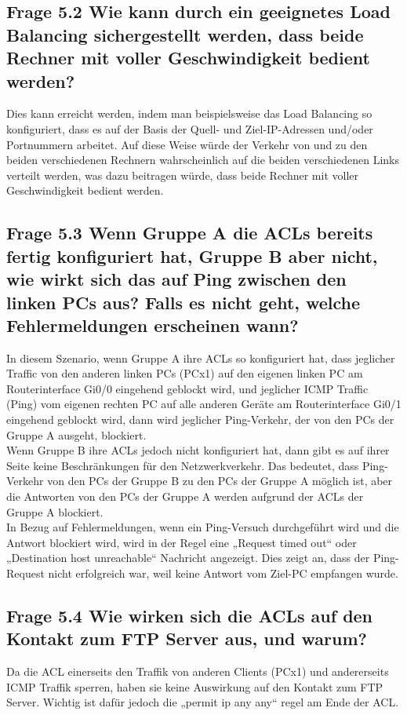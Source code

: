 \documentclass{article}
\begin{document}
\subsection*{Frage 5.2 \normalfont Wie kann durch ein geeignetes Load Balancing sichergestellt werden, dass beide Rechner mit voller Geschwindigkeit bedient werden?}
Dies kann erreicht werden, indem man beispielsweise das Load Balancing so konfiguriert, dass es auf der Basis der Quell- und Ziel-IP-Adressen und/oder Portnummern arbeitet. Auf diese Weise würde der Verkehr von und zu den beiden verschiedenen Rechnern wahrscheinlich auf die beiden verschiedenen Links verteilt werden, was dazu beitragen würde, dass beide Rechner mit voller Geschwindigkeit bedient werden.\\

\subsection*{Frage 5.3 \normalfont Wenn Gruppe A die ACLs bereits fertig konfiguriert hat, Gruppe B aber nicht, wie wirkt sich das auf Ping zwischen den linken PCs aus? Falls es nicht geht, welche Fehlermeldungen erscheinen wann?}
In diesem Szenario, wenn Gruppe A ihre ACLs so konfiguriert hat, dass jeglicher Traffic von den anderen linken PCs (PCx1) auf den eigenen linken PC am Routerinterface Gi0/0 eingehend geblockt wird, und jeglicher ICMP Traffic (Ping) vom eigenen rechten PC auf alle anderen Geräte am Routerinterface Gi0/1 eingehend geblockt wird, dann wird jeglicher Ping-Verkehr, der von den PCs der Gruppe A ausgeht, blockiert.\\

\noindent Wenn Gruppe B ihre ACLs jedoch nicht konfiguriert hat, dann gibt es auf ihrer Seite keine Beschränkungen für den Netzwerkverkehr. Das bedeutet, dass Ping-Verkehr von den PCs der Gruppe B zu den PCs der Gruppe A möglich ist, aber die Antworten von den PCs der Gruppe A werden aufgrund der ACLs der Gruppe A blockiert.\\

\noindent In Bezug auf Fehlermeldungen, wenn ein Ping-Versuch durchgeführt wird und die Antwort blockiert wird, wird in der Regel eine „Request timed out“ oder „Destination host unreachable“ Nachricht angezeigt. Dies zeigt an, dass der Ping-Request nicht erfolgreich war, weil keine Antwort vom Ziel-PC empfangen wurde.\\

\pagebreak

\subsection*{Frage 5.4 \normalfont Wie wirken sich die ACLs auf den Kontakt zum FTP Server aus, und warum?} 
Da die ACL einerseits den Traffik von anderen Clients (PCx1) und andererseits ICMP Traffik sperren, haben sie keine Auswirkung auf den Kontakt zum FTP Server. Wichtig ist dafür jedoch die „permit ip any any“ regel am Ende der ACL.\\
\end{document}
